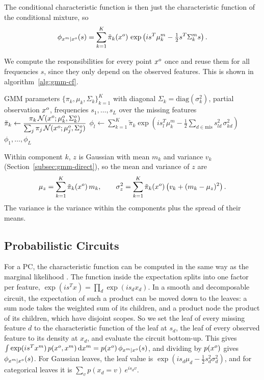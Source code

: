 The conditional characteristic function is then just the characteristic function of the conditional mixture, so
\[
  \phi_{x^m \mid x^o}(s) = \sum_{k=1}^{K} \tilde{\pi}_k(x^o) \, \exp \left( i s^T \mu_k^m - \tfrac{1}{2} s^T \Sigma_k^m s \right).
\]

We compute the responsibilities for every point $x^o$ once and reuse them for all frequencies $s$, since
they only depend on the observed features.
This is shown in algorithm~\ref{alg:gmm-cf}.

\begin{algorithm}[H]
\caption{Conditional characteristic function of a GMM}
\label{alg:gmm-cf}
\begin{algorithmic}[1]
\Require GMM parameters $\{\pi_k, \mu_k, \Sigma_k\}_{k=1}^{K}$ with diagonal $\Sigma_k = \mathrm{diag}(\sigma_k^2)$, partial observation $x^o$, frequencies $s_1, \dots, s_L$ over the missing features
  \State $\tilde{\pi}_k \gets \dfrac{\pi_k \, \mathcal{N}(x^o;\mu_k^o,\Sigma_k^o)}{\sum_{j}\pi_j \,\mathcal{N}(x^o;\mu_j^o,\Sigma_j^o)}$
\EndFor
{}
  \State $\phi_l \gets \sum_{k=1}^{K} \tilde{\pi}_k \exp \left( i s_l^T \mu_k^m - \tfrac{1}{2} \sum_{d \in \mathrm{mis}} s_{ld}^2\, \sigma_{kd}^2 \right)$
\EndFor
\State \Return $\phi_1, \dots, \phi_L$
\end{algorithmic}
\end{algorithm}

Within component $k$, $z$ is Gaussian with mean $m_k$ and variance $v_k$ (Section~\ref{subsec:gmm-direct}), so the mean and variance of $z$ are
\[
  \mu_z = \sum_{k=1}^{K} \tilde{\pi}_k(x^o)\, m_k, \qquad \sigma_z^2 = \sum_{k=1}^{K} \tilde{\pi}_k(x^o) \left( v_k + (m_k - \mu_z)^2 \right).
\]
The variance is the variance within the components plus the spread of their means.

\subsection{Probabilistic Circuits}
\label{subsec:pc-cf}

For a PC, the characteristic function can be computed in the same way as the marginal likelihood \cite{yu2023characteristic}.
The function inside the expectation splits into one factor per feature, $\exp(i s^T x) = \prod_{d} \exp(i s_d x_d)$.
In a smooth and decomposable circuit, the expectation of such a product can be moved down to the leaves:
a sum node takes the weighted sum of its children, and a product node the product of its children, which
have disjoint scopes. So we set the leaf of every missing feature $d$ to the characteristic function of the leaf at $s_d$,
the leaf of every observed feature to its density at $x_d$, and evaluate the circuit bottom-up. This gives
$\int \exp(i s^T x^m)\, p(x^o, x^m)\, \mathrm{d}x^m = p(x^o)\, \phi_{x^m \mid x^o}(s)$, and dividing by $p(x^o)$ gives $\phi_{x^m \mid x^o}(s)$.
For Gaussian leaves, the leaf value is $\exp(i s_d \mu_d - \frac{1}{2} s_d^2 \sigma_d^2)$, and for categorical leaves it is $\sum_v p(x_d = v)\, e^{i s_d v}$.

